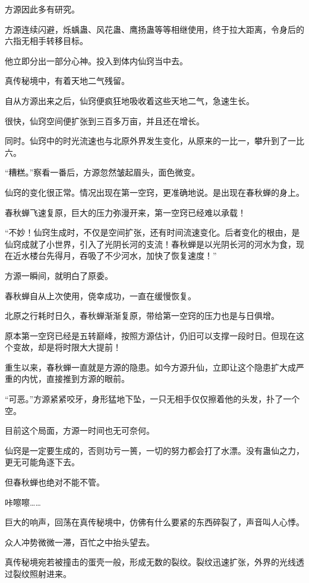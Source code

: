 \begin{this_body}
方源因此多有研究。

方源连续闪避，烁蝺蛊、风花蛊、鹰扬蛊等等相继使用，终于拉大距离，令身后的六指无相手转移目标。

他立即分出一部分心神。投入到体内仙窍当中去。

真传秘境中，有着天地二气残留。

自从方源出来之后，仙窍便疯狂地吸收着这些天地二气，急速生长。

很快，仙窍空间便扩张到三百多万亩，并且还在增长。

同时。仙窍中的时光流速也与北原外界发生变化，从原来的一比一，攀升到了一比六。

“糟糕。”察看一番后，方源忽然皱起眉头，面色微变。

仙窍的变化很正常。情况出现在第一空窍，更准确地说。是出现在春秋蝉的身上。

春秋蝉飞速复原，巨大的压力弥漫开来，第一空窍已经难以承载！

“不妙！仙窍生成时，不仅是空间扩张，还有时间流速变化。后者变化的根由，是仙窍成就了小世界，引入了光阴长河的支流！春秋蝉是以光阴长河的河水为食，现在近水楼台先得月，吞吸了不少河水，加快了恢复速度！”

方源一瞬间，就明白了原委。

春秋蝉自从上次使用，侥幸成功，一直在缓慢恢复。

北原之行耗时日久，春秋蝉渐渐复原，带给第一空窍的压力也是与日俱增。

原本第一空窍已经是五转巅峰，按照方源估计，仍旧可以支撑一段时日。但现在这个变故，却是将时限大大提前！

重生以来，春秋蝉一直就是方源的隐患。如今方源升仙，立即让这个隐患扩大成严重的内忧，直接推到方源的眼前。

“可恶。”方源紧紧咬牙，身形猛地下坠，一只无相手仅仅擦着他的头发，扑了一个空。

目前这个局面，方源一时间也无可奈何。

仙窍是一定要生成的，否则功亏一篑，一切的努力都会打了水漂。没有蛊仙之力，更无可能角逐下去。

但春秋蝉也绝对不能不管。

咔嚓嚓……

巨大的响声，回荡在真传秘境中，仿佛有什么要紧的东西碎裂了，声音叫人心悸。

众人冲势微微一滞，百忙之中抬头望去。

真传秘境宛若被撞击的蛋壳一般，形成无数的裂纹。裂纹迅速扩张，外界的光线透过裂纹照射进来。


\end{this_body}
